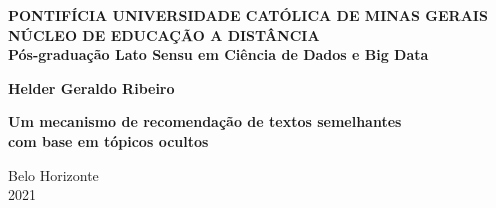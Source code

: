 \begin{titlepage}
    \begin{center}
        \vspace*{1cm}

        \large
        \textbf{PONTIFÍCIA UNIVERSIDADE CATÓLICA DE MINAS GERAIS} \\
        \textbf{NÚCLEO DE EDUCAÇÃO A DISTÂNCIA} \\
        \textbf{Pós-graduação Lato Sensu em Ciência de Dados e Big Data} \\
 
        \vspace{2.5cm}
 
        \textbf{Helder Geraldo Ribeiro}
  
        \vspace{1.5cm}
        
        \huge
        \textbf{Um mecanismo de recomendação de textos semelhantes} \\ 
        \textbf{com base em tópicos ocultos} \\
             
        \vfill
             
        \normalsize
        Belo Horizonte\\
        2021\\
    \end{center}
\end{titlepage}
